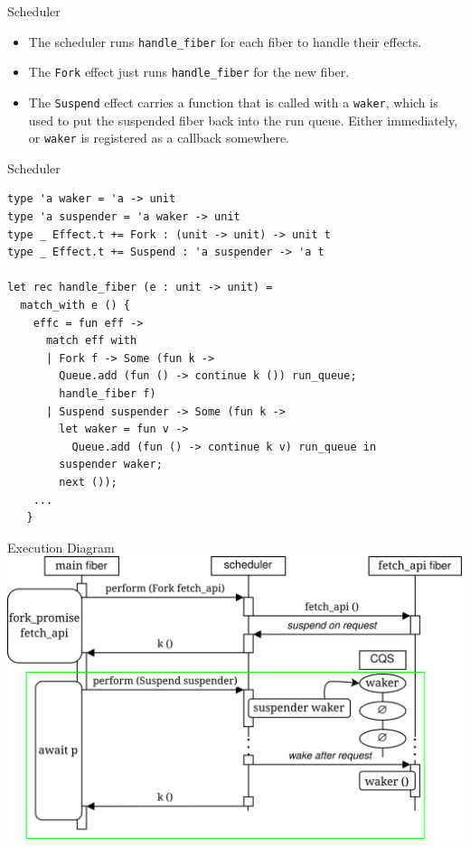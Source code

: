 \documentclass[aspectratio=43]{beamer}
\newcommand{\ocaml}[1]{\texttt{#1}}
\begin{document}
\begin{frame}{Scheduler}
    \begin{itemize}
        \item The scheduler runs \ocaml{handle_fiber} for each fiber to handle their effects.
        \item The \ocaml{Fork} effect just runs \ocaml{handle_fiber} for the new fiber.
        \item The \ocaml{Suspend} effect carries a function that is called with a \ocaml{waker}, which is used to put the suspended fiber back into the run queue. Either immediately, or \ocaml{waker} is registered as a callback somewhere.
    \end{itemize}
\end{frame}

\begin{frame}[fragile]{Scheduler}
    \begin{verbatim}
type 'a waker = 'a -> unit
type 'a suspender = 'a waker -> unit
type _ Effect.t += Fork : (unit -> unit) -> unit t
type _ Effect.t += Suspend : 'a suspender -> 'a t

let rec handle_fiber (e : unit -> unit) =
  match_with e () {
    effc = fun eff ->
      match eff with
      | Fork f -> Some (fun k ->
        Queue.add (fun () -> continue k ()) run_queue;
        handle_fiber f)
      | Suspend suspender -> Some (fun k -> 
        let waker = fun v -> 
          Queue.add (fun () -> continue k v) run_queue in
        suspender waker;
        next ());
    ...
   }
    \end{verbatim}
\end{frame}

\begin{frame}{Execution Diagram}
    \includegraphics[width=\textwidth]{sequence diagram.png}
\end{frame}
\end{document}

